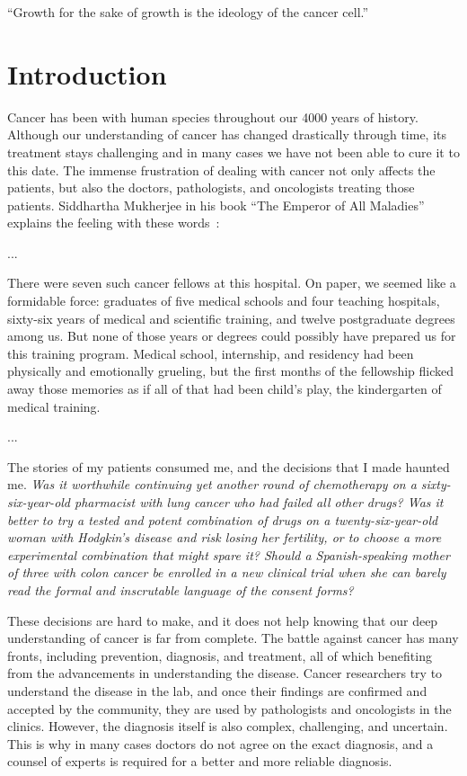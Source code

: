 
\begin{savequote}[.5\linewidth]
  ``Growth for the sake of growth is the ideology of the cancer cell.''
\end{savequote}
\chapter{Introduction}
\label{ch:intro}
Cancer has been with human species throughout our 4000 years of history.
Although our understanding of cancer has changed drastically through time, its
treatment stays challenging and in many cases we have not been able to cure it
to this date. The immense frustration of dealing with cancer not only affects
the patients, but also the doctors, pathologists, and oncologists treating those
patients. Siddhartha Mukherjee in his book ``The Emperor of All Maladies''
explains the feeling with these
words~\cite[prologue]{the-emperor-of-all-maladies}:

\begin{displayquote}
  ...
  
  There were seven such cancer fellows at this hospital. On paper, we seemed
  like a formidable force: graduates of five medical schools and four teaching
  hospitals, sixty-six years of medical and scientific training, and twelve
  postgraduate degrees among us. But none of those years or degrees could
  possibly have prepared us for this training program. Medical school,
  internship, and residency had been physically and emotionally grueling, but
  the first months of the fellowship flicked away those memories as if all of
  that had been child's play, the kindergarten of medical training.

  ...

  The stories of my patients consumed me, and the decisions that I made haunted
  me. \emph{Was it worthwhile continuing yet another round of chemotherapy on a
    sixty-six-year-old pharmacist with lung cancer who had failed all other
    drugs? Was it better to try a tested and potent combination of drugs on a
    twenty-six-year-old woman with Hodgkin's disease and risk losing her
    fertility, or to choose a more experimental combination that might spare it?
    Should a Spanish-speaking mother of three with colon cancer be enrolled in a
    new clinical trial when she can barely read the formal and inscrutable
    language of the consent forms?}
\end{displayquote}

These decisions are hard to make, and it does not help knowing that our deep
understanding of cancer is far from complete. The battle against cancer has many
fronts, including prevention, diagnosis, and treatment, all of which benefiting
from the advancements in understanding the disease. Cancer researchers try to
understand the disease in the lab, and once their findings are confirmed and
accepted by the community, they are used by pathologists and oncologists in the
clinics. However, the diagnosis itself is also complex, challenging, and
uncertain. This is why in many cases doctors do not agree on the exact
diagnosis, and a counsel of experts is required for a better and more reliable
diagnosis.

